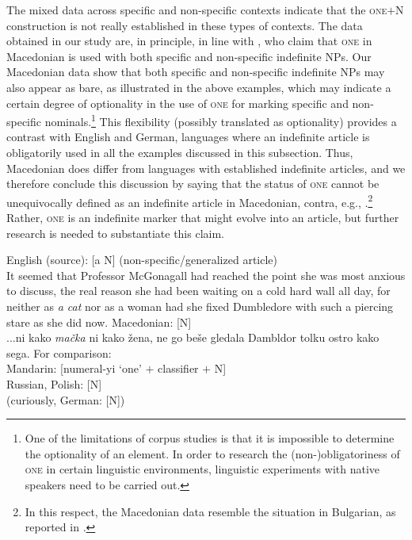 \documentclass[output=paper,colorlinks,citecolor=brown]{langscibook}
\begin{document}
\noindent The mixed data across specific and non-specific contexts indicate that the \textsc{one}$+$N construction is not really established in these types of contexts. The data obtained in our study are, in principle, in line with \citet{Hwaszcz.Kedzierska2018}, who claim that \textsc{one} in Macedonian is used with both specific and non-specific indefinite NPs. Our Macedonian data show that both specific and non-specific indefinite NPs may also appear as bare, as illustrated in the above examples, which may indicate a certain degree of optionality in the use of \textsc{one} for marking specific and non-specific nominals.\footnote{One of the limitations of corpus studies is that it is impossible to determine the optionality of an element. In order to research the (non-)obligatoriness of \textsc{one} in certain linguistic environments, linguistic experiments with native speakers need to be carried out.} This flexibility (possibly translated as optionality) provides a contrast with English and German, languages where an indefinite article is obligatorily used in all the examples discussed in this subsection. Thus, Macedonian does differ from languages with established indefinite articles, and we therefore conclude this discussion by saying that the status of \textsc{one} cannot be unequivocally defined as an indefinite article in Macedonian, contra, e.g., \citet{Tomić2006}.\footnote{In this respect, the Macedonian data resemble the situation in Bulgarian, as reported in \citet{Geist2013}.} Rather, \textsc{one} is an indefinite marker that might evolve into an article, but further research is needed to substantiate this claim. 


\iffalse
 \ea \ea \label{ex:2a} English (source): [a N]			\hfill		(non-specific/generalized article) \\
It seemed that Professor McGonagall had reached the point she was most anxious to discuss, the real reason she had been waiting on a cold hard wall all day, for neither as \textit{a cat} nor as a woman had she fixed Dumbledore with such a piercing stare as she did now.
\ex \label{ex:2b} Macedonian: [N]\\
...ni kako \textit{mačka} ni kako žena, ne go beše gledala Dambldor tolku ostro kako sega.
\ex For comparison: \\
Mandarin: [numeral-yi \lq one' $+$ classifier $+$ N]\\
	Russian, Polish: [N]\\
	(curiously, German: [N])\\
\z\z
\end{document}
